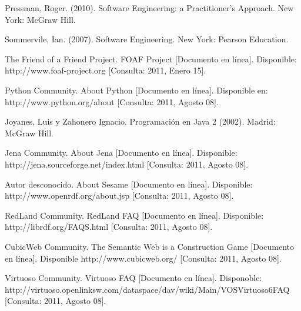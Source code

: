 \begin{thebibliography}{20}
 Pressman, Roger. (2010). Software Engineering: a Practitioner's Approach. New York: McGraw Hill.

 Sommervile, Ian. (2007). Software Engineering. New York: Pearson Education.

 The Friend of a Friend Project. FOAF Project [Documento en línea]. Disponible: http://www.foaf-project.org [Consulta: 2011, Enero 15].

 Python Community. About Python [Documento en línea]. Disponible en: http://www.python.org/about [Consulta: 2011, Agosto 08].

 Joyanes, Luis y Zahonero Ignacio. Programación en Java 2 (2002). Madrid: McGraw Hill.

 Jena Community. About Jena [Documento en línea]. Disponible: http://jena.sourceforge.net/index.html [Consulta: 2011, Agosto 08].

 Autor desconocido. About Sesame [Documento en línea]. Disponible: http://www.openrdf.org/about.jsp [Consulta: 2011, Agosto 08].

 RedLand Community. RedLand FAQ [Documento en línea]. Disponible: http://librdf.org/FAQS.html [Consulta: 2011, Agosto 08].

 CubicWeb Community. The Semantic Web is a Construction Game [Documento en línea]. Disponible http://www.cubicweb.org/ [Consulta: 2011, Agosto 08].

 Virtuoso Community. Virtuoso FAQ [Documento en línea]. Disponoble: http://virtuoso.openlinksw.com/dataspace/dav/wiki/Main/VOSVirtuoso6FAQ [Consulta: 2011, Agosto 08].

\end{thebibliography}
